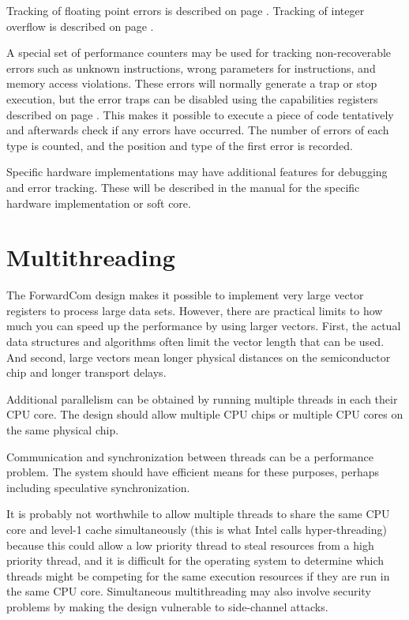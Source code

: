 \documentclass[forwardcom.tex]{subfiles}
\begin{document}
Tracking of floating point errors is described on page \pageref{FloatingPointErrors}. Tracking of integer overflow is described on page \pageref{integerOverflowDetection}.
\vv

A special set of performance counters may be used for tracking non-recoverable errors such as unknown instructions, wrong parameters for instructions, and memory access violations. These errors will normally generate a trap or stop execution, but the error traps can be disabled using the capabilities registers described on page \pageref{table:capabilitiesRegisters}. This makes it possible to execute a piece of code tentatively and afterwards check if any errors have occurred. The number of errors of each type is counted, and the position and type of the first error is recorded.
\vv

Specific hardware implementations may have additional features for debugging and error tracking. These will be described in the manual for the specific hardware implementation or soft core.
\vv


\section{Multithreading}
The ForwardCom design makes it possible to implement very large vector registers to process large data sets. However, there are practical limits to how much you can speed up the performance by using larger vectors. First, the actual data structures and algorithms often limit the vector length that can be used. And second, large vectors mean longer physical distances on the semiconductor chip and longer transport delays.
\vv

Additional parallelism can be obtained by running multiple threads in each their CPU core. The design should allow multiple CPU chips or multiple CPU cores on the same physical chip.
\vv

Communication and synchronization between threads can be a performance problem. The system should have efficient means for these purposes, perhaps including speculative synchronization.
\vv

It is probably not worthwhile to allow multiple threads to share the same CPU core and level-1 cache simultaneously (this is what Intel calls hyper-threading) because this could allow a low priority thread to steal resources from a high priority thread, and it is difficult for the operating system to determine which threads might be competing for the same execution resources if they are run in the same CPU core. Simultaneous multithreading may also involve security problems by making the design vulnerable to side-channel attacks.
\vv
\end{document}
